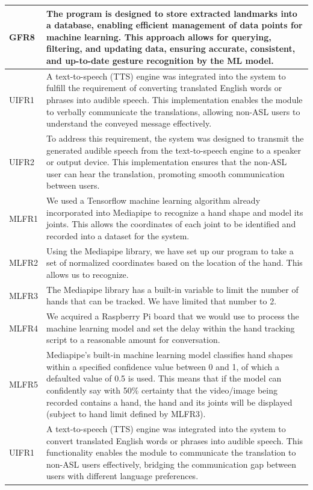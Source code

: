 \documentclass[12pt, titlepage]{article}
\begin{document}
\begin{longtable}{p{}|p{}}
\hline
GFR8
& The program is designed to store extracted landmarks into a database, enabling efficient management of data points for machine learning. This approach allows for querying, filtering, and updating data, ensuring accurate, consistent, and up-to-date gesture recognition by the ML model.\\
\hline
UIFR1
& A text-to-speech (TTS) engine was integrated into the system to fulfill the requirement of converting translated English words or phrases into audible speech. This implementation enables the module to verbally communicate the translations, allowing non-ASL users to understand the conveyed message effectively.\\
\hline
UIFR2
& To address this requirement, the system was designed to transmit the generated audible speech from the text-to-speech engine to a speaker or output device. This implementation ensures that the non-ASL user can hear the translation, promoting smooth communication between users.\\
\hline
MLFR1
& We used a Tensorflow machine learning algorithm already incorporated into Mediapipe to recognize a hand shape and model its joints. This allows the coordinates of each joint to be identified and recorded into a dataset for the system.\\
\hline
MLFR2
& Using the Mediapipe library, we have set up our program to take a set of normalized coordinates based on the location of the hand. This allows us to recognize.\\
\hline
MLFR3
& The Mediapipe library has a built-in variable to limit the number of hands that can be tracked. We have limited that number to 2.\\
\hline
MLFR4
& We acquired a Raspberry Pi board that we would use to process the machine learning model and set the delay within the hand tracking script to a reasonable amount for conversation.\\
\hline
MLFR5
& Mediapipe’s built-in machine learning model classifies hand shapes within a specified confidence value between 0 and 1, of which a defaulted value of 0.5 is used. This means that if the model can confidently say with 50\% certainty that the video/image being recorded contains a hand, the hand and its joints will be displayed (subject to hand limit defined by MLFR3).\\
\hline
UIFR1
& A text-to-speech (TTS) engine was integrated into the system to convert translated English words or phrases into audible speech. This functionality enables the module to communicate the translation to non-ASL users effectively, bridging the communication gap between users with different language preferences.\\

\end{longtable}
\end{document}
